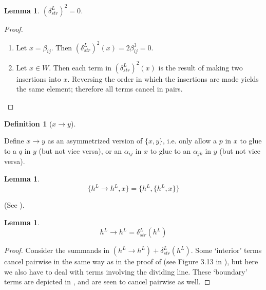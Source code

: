 \documentclass[a4paper,final, reqno]{amsart}
\theoremstyle{plain}
\newtheorem{Lemma}[Th]{Lemma}
\theoremstyle{definition}
\newtheorem{Def}[Th]{Definition}
\begin{document}
	
	
	\begin{Lemma}
		$(\delta_{str}^L)^2=0$.
	\end{Lemma}
	\begin{proof}\-\
		
		\begin{enumerate}
			\item Let $x = \beta_{ij}$. Then $(\delta_{str}^L)^2(x) = 2\beta_{ij}^3 = 0$.
			
			\item  Let $x \in W$. Then each term in $(\delta_{str}^L)^2(x)$ is the result of making two insertions into $x$. Reversing the order in which the insertions are made yields the same element; therefore all terms cancel in pairs.
		\end{enumerate}
		
	\end{proof}
	
	
	\begin{Def}[$x\to y$]\-\
		
		Define $x\to y$ as an asymmetrized version of $\{x,y\}$, i.e. only allow a $p$ in $x$ to glue to a $q$ in $y$ (but not vice versa), or an $\alpha_{ij}$ in $x$ to glue to an $\alpha_{jk}$ in $y$ (but not vice versa).
	\end{Def}
	
	
	\begin{Lemma}
		\[ \{h^L\to h^L, x\} = \{h^L, \{h^L, x\}\}\]
	\end{Lemma}
	
	(See ).
	
	
	
	\begin{Lemma}
		\[ h^L\to h^L = \delta_{str}^L(h^L)\]
	\end{Lemma}
	\begin{proof}
		Consider the summands in $(h^L\to h^L) + \delta_{str}^L(h^L)$. Some `interior' terms cancel pairwise in the same way as in the proof of  (see Figure 3.13 in \cite{ng}), but here we also have to deal with terms involving the dividing line. These `boundary' terms are depicted in , and are seen to cancel pairwise as well.
	\end{proof}
	
\end{document}
